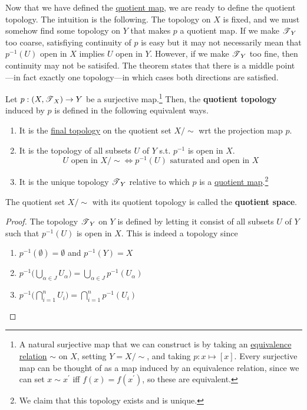   Now that we have defined the \hyperref[def:quotient-map]{quotient map}, we are ready to define the quotient topology. The intuition is the following. The topology on $X$ is fixed, and we must somehow find some topology on $Y$ that makes $p$ a quotient map. If we make $\operatorname{\mathscr{T}}_Y$ too coarse, satisfiying continuity of $p$ is easy but it may not necessarily mean that $p^{-1}(U)$ open in $X$ implies $U$ open in $Y$. However, if we make $\operatorname{\mathscr{T}}_Y$ too fine, then continuity may not be satisifed. The theorem states that there is a middle point---in fact exactly one topology---in which cases both directions are satisfied. 

  \begin{definition}
    \label{def:quotient-topology}
    Let $p: (X, \operatorname{\mathscr{T}}_X) \rightarrow Y$ be a surjective map.\footnote{A natural surjective map that we can construct is by taking an \hyperref[st-def:equivalence_relation]{equivalence relation} $\sim$ on $X$, setting $Y = X/{\sim}$, and taking $p: x \mapsto [x]$. Every surjective map can be thought of as a map induced by an equivalence relation, since we can set $x \sim x^\prime$ iff $f(x) = f(x^\prime)$, so these are equivalent.} Then, the \textbf{quotient topology} induced by $p$ is defined in the following equivalent ways. 
    \begin{enumerate}
      \item It is the \hyperref[def:final-topology]{final topology} on the quotient set $X/{\sim}$ wrt the projection map $p$. 
      \item It is the topology of all subsets $U$ of $Y$ s.t. $p^{-1}$ is open in $X$. 
      \begin{equation}
        U \text{ open in } X/{\sim} \iff p^{-1} (U) \text{ saturated and open in } X
      \end{equation}
      \item It is the unique topology $\operatorname{\mathscr{T}}_Y$ relative to which $p$ is a \hyperref[def:quotient-map]{quotient map}.\footnote{We claim that this topology exists and is unique.}
    \end{enumerate}
    The quotient set $X/{\sim}$ with its quotient topology is called the \textbf{quotient space}. 
  \end{definition}
  \begin{proof}
    The topology $\operatorname{\mathscr{T}}_Y$ on $Y$ is defined by letting it consist of all subsets $U$ of $Y$ such that $p^{-1}(U)$ is open in $X$. This is indeed a topology since
    \begin{enumerate}
      \item $p^{-1} (\emptyset) = \emptyset$ and $p^{-1}(Y) = X$
      \item $p^{-1} \Big( \bigcup_{\alpha \in J} U_\alpha \Big) = \bigcup_{\alpha \in J} p^{-1} (U_\alpha)$
      \item $p^{-1} \Big( \bigcap_{i=1}^n U_i \Big) = \bigcap_{i=1}^n p^{-1} (U_i)$
    \end{enumerate}
  \end{proof}

